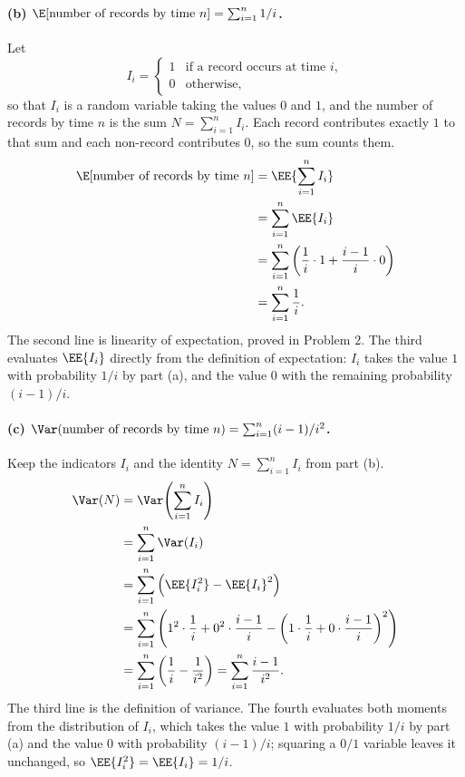 \documentclass[11pt]{article}
\begin{document}
\paragraph{(b) $\E[\text{number of records by time } n] = \sum_{i=1}^{n} 1/i$.}
Let
\[
  I_i =
  \begin{cases}
    1 & \text{if a record occurs at time } i,\\
    0 & \text{otherwise,}
  \end{cases}
\]
so that $I_i$ is a random variable taking the values $0$ and $1$, and the number of
records by time $n$ is the sum $N = \sum_{i=1}^{n} I_i$. Each record contributes exactly
$1$ to that sum and each non-record contributes $0$, so the sum counts them.
\begin{align*}
  \E[\text{number of records by time } n]
    &= \EE{\sum_{i=1}^{n} I_i}\\
    &= \sum_{i=1}^{n} \EE{I_i}\\
    &= \sum_{i=1}^{n} \left(\frac{1}{i}\cdot 1 + \frac{i-1}{i}\cdot 0\right)\\
    &= \sum_{i=1}^{n} \frac{1}{i} .
\end{align*}
The second line is linearity of expectation, proved in Problem 2. The third evaluates
$\EE{I_i}$ directly from the definition of expectation: $I_i$ takes the value $1$ with
probability $1/i$ by part (a), and the value $0$ with the remaining probability
$(i-1)/i$.

\paragraph{(c) $\Var(\text{number of records by time } n) = \sum_{i=1}^{n} (i-1)/i^2$.}
Keep the indicators $I_i$ and the identity $N = \sum_{i=1}^{n} I_i$ from part (b).
\begin{align*}
  \Var(N)
    &= \Var\!\left(\sum_{i=1}^{n} I_i\right)\\
    &= \sum_{i=1}^{n} \Var(I_i)\\
    &= \sum_{i=1}^{n} \left(\EE{I_i^2} - \EE{I_i}^2\right)\\
    &= \sum_{i=1}^{n}
       \left(1^2\cdot\frac{1}{i} + 0^2\cdot\frac{i-1}{i}
             - \left(1\cdot\frac{1}{i} + 0\cdot\frac{i-1}{i}\right)^{2}\right)\\
    &= \sum_{i=1}^{n} \left(\frac{1}{i} - \frac{1}{i^2}\right)
     = \sum_{i=1}^{n} \frac{i-1}{i^2} .
\end{align*}
The third line is the definition of variance. The fourth evaluates both moments
from the distribution of $I_i$, which takes the value $1$ with probability $1/i$
by part (a) and the value $0$ with probability $(i-1)/i$; squaring a $0/1$
variable leaves it unchanged, so $\EE{I_i^2} = \EE{I_i} = 1/i$.
\end{document}
